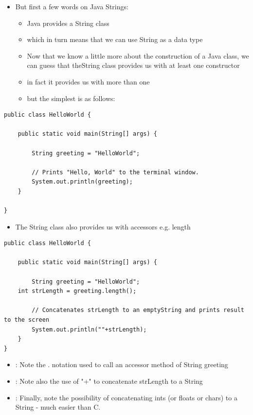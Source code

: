 \documentclass{beamer}
\begin{document}
\begin{frame}[fragile]
\begin{itemize}
\item But first a few words on Java Strings:
\begin{itemize}
\item Java provides a String class
\item which in turn means that we can use String as a data type
\item Now that we know a little more about the construction of a Java class, we can guess that theString class provides us with at least one constructor
\item in fact it provides us with more than one
\item but the simplest is as follows:
\end{itemize}
\end{itemize}
\begin{block}{}
\small
\begin{lstlisting}
public class HelloWorld {

    public static void main(String[] args) {
    	
    	String greeting = "HelloWorld";
    	
        // Prints "Hello, World" to the terminal window.
        System.out.println(greeting);
    }

}

\end{lstlisting}
\end{block}
\end{frame}

\begin{frame}[fragile]
\begin{itemize}
\item The String class also provides us with accessors e.g. length
\end{itemize}
\begin{block}{}
\small
\begin{lstlisting}
public class HelloWorld {

    public static void main(String[] args) {
    	
    	String greeting = "HelloWorld";
	int strLength = greeting.length();
    	
        // Concatenates strLength to an emptyString and prints result to the screen
        System.out.println(""+strLength);
    }
}
\end{lstlisting}
\end{block}
\begin{itemize}
\item: Note the . notation used to call an accessor method of String greeting
\item: Note also the use of "+" to concatenate strLength to a String
\item: Finally, note the possibility of concatenating ints (or floats or chars) to a String - much easier than C.
\end{itemize}
\end{frame}
\end{document}

